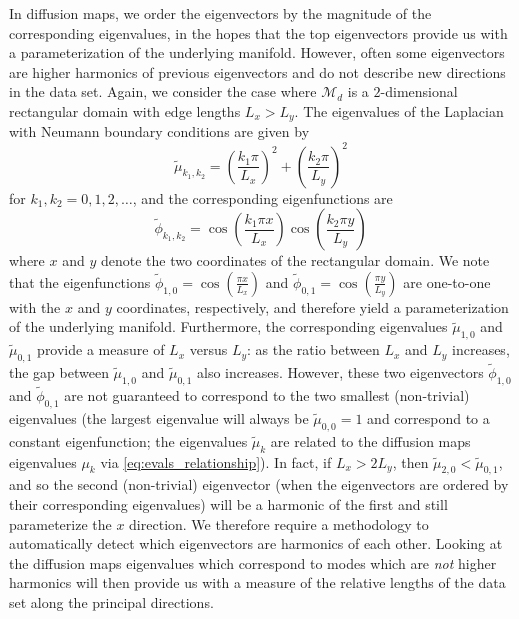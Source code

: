 \documentclass[preprint]{elsarticle}
\begin{document}
In diffusion maps, we order the eigenvectors by the magnitude of the corresponding eigenvalues, in the hopes that the top eigenvectors provide us with a parameterization of the underlying manifold.
%
However, often some eigenvectors are higher harmonics of previous eigenvectors and do not describe new directions in the data set. 
%
Again, we consider the case where $\mathcal{M}_d$ is a $2$-dimensional rectangular domain with edge lengths $L_x  > L_y$. 
%
The eigenvalues of the Laplacian with Neumann boundary conditions are given by
\begin{equation}
\tilde{\mu}_{k_1, k_2} = \left( \frac{k_1 \pi}{L_x} \right)^2 + \left( \frac{k_2 \pi}{L_y} \right)^2
\end{equation}
for $k_1, k_2 = 0, 1, 2, \dots$,
and the corresponding eigenfunctions are 
\begin{equation}
\tilde{\phi}_{k_1, k_2} = \cos \left( \frac{k_1 \pi x}{L_x} \right) \cos \left( \frac{k_2 \pi y}{L_y} \right)
\end{equation}
where $x$ and $y$ denote the two coordinates of the rectangular domain. 
%
We note that the eigenfunctions $\tilde{\phi}_{1, 0} = \cos \left( \frac{\pi x}{L_x} \right)$ and $\tilde{\phi}_{0, 1} = \cos \left( \frac{\pi y}{L_y} \right)$ are one-to-one with the $x$ and $y$ coordinates, respectively, and therefore yield a parameterization of the underlying manifold. 
%
Furthermore, the corresponding eigenvalues $\tilde{\mu}_{1,0}$ and $\tilde{\mu}_{0,1}$ provide a measure of $L_x$ versus $L_y$: as the ratio between $L_x$ and $L_y$ increases, the gap between $\tilde{\mu}_{1,0}$ and $\tilde{\mu}_{0,1}$ also increases.
%
However, these two eigenvectors $\tilde{\phi}_{1, 0}$ and $\tilde{\phi}_{0, 1}$ are not guaranteed to correspond to the two smallest (non-trivial) eigenvalues (the largest eigenvalue will always be $\tilde{\mu}_{0,0} = 1$ and correspond to a constant eigenfunction; the eigenvalues $\tilde{\mu}_k$ are related to the diffusion maps eigenvalues $\mu_k$ via \eqref{eq:evals_relationship}). 
%
In fact, if $L_x > 2 L_y$, then $\tilde{\mu}_{2, 0} < \tilde{\mu}_{0, 1}$, and so the second (non-trivial) eigenvector (when the eigenvectors are ordered by their corresponding eigenvalues) will be a harmonic of the first and still parameterize the $x$ direction. 
%
We therefore require a methodology to automatically detect which eigenvectors are harmonics of each other. 
%
Looking at the diffusion maps eigenvalues which correspond to modes which are {\em not} higher harmonics will then provide us with a measure of the relative lengths of the data set along the principal directions. 
\end{document}
